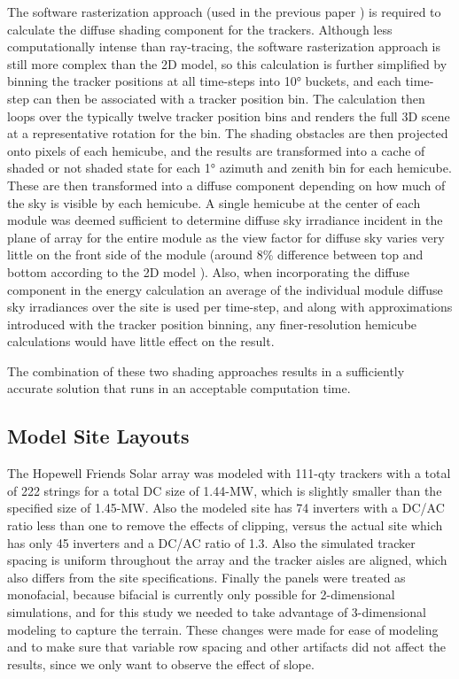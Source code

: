 \documentclass[conference]{IEEEtran}
\begin{document}
The software rasterization approach (used in the previous paper \cite{Mikofski_9300381}) is required to calculate the diffuse shading component for the trackers. Although less computationally intense than ray-tracing, the software rasterization approach is still more complex than the 2D model, so this calculation is further simplified by binning the tracker positions at all time-steps into 10° buckets, and each time-step can then be associated with a tracker position bin. The calculation then loops over the typically twelve tracker position bins and renders the full 3D scene at a representative rotation for the bin. The shading obstacles are then projected onto pixels of each hemicube, and the results are transformed into a cache of shaded or not shaded state for each 1° azimuth and zenith bin for each hemicube. These are then transformed into a diffuse component depending on how much of the sky is visible by each hemicube. A single hemicube at the center of each module was deemed sufficient to determine diffuse sky irradiance incident in the plane of array for the entire module as the view factor for diffuse sky varies very little on the front side of the module (around 8\% difference between top and bottom according to the 2D model \cite{Mikofski_8980572}). Also, when incorporating the diffuse component in the energy calculation an average of the individual module diffuse sky irradiances over the site is used per time-step, and along with approximations introduced with the tracker position binning, any finer-resolution hemicube calculations would have little effect on the result.

The combination of these two shading approaches results in a sufficiently accurate solution that runs in an acceptable computation time.

\subsection{Model Site Layouts}

The Hopewell Friends Solar array was modeled with 111-qty trackers with a total of 222 strings for a total DC size of 1.44-MW, which is slightly smaller than the specified size of 1.45-MW. Also the modeled site has 74 inverters with a DC/AC ratio less than one to remove the effects of clipping, versus the actual site which has only 45 inverters and a DC/AC ratio of 1.3. Also the simulated tracker spacing is uniform throughout the array and the tracker aisles are aligned, which also differs from the site specifications. Finally the panels were treated as monofacial, because bifacial is currently only possible for 2-dimensional simulations, and for this study we needed to take advantage of 3-dimensional modeling to capture the terrain. These changes were made for ease of modeling and to make sure that variable row spacing and other artifacts did not affect the results, since we only want to observe the effect of slope.
\end{document}
